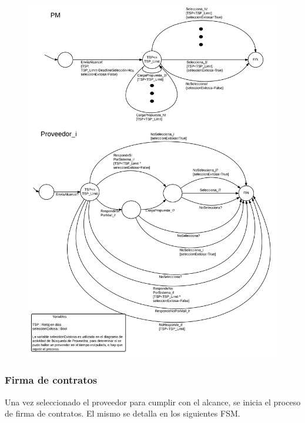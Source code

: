 \begin{figure}[H]
\centering
\includegraphics[width=0.8\linewidth]{diag/nuevos/fsm-selprov.png}
\label{fsm-selprov}
\end{figure}


		\subsubsection{Firma de contratos}
Una vez seleccionado el proveedor para cumplir con el alcance, se inicia 
el proceso de firma de contratos. El mismo se detalla en los siguientes FSM. 

